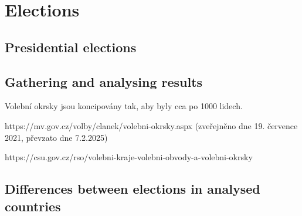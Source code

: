 \section{Elections} 

\subsection{Presidential elections}

\subsection{Gathering and analysing results}

\begin{koment}
Volební okrsky jsou koncipovány tak, aby byly cca po 1000 lidech. 

https://mv.gov.cz/volby/clanek/volebni-okrsky.aspx (zveřejněno dne 19. července 2021, převzato dne 7.2.2025) 

https://csu.gov.cz/rso/volebni-kraje-volebni-obvody-a-volebni-okrsky 
\end{koment}

\subsection{Differences between elections in analysed countries} 